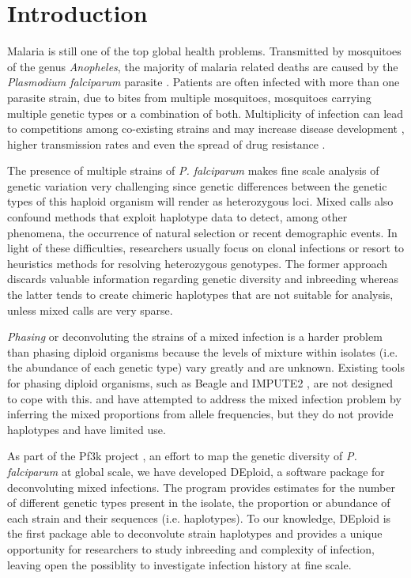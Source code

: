 \documentclass{bioinfo}
\begin{document}
\maketitle

\section{Introduction}
Malaria is still one of the top global health problems. Transmitted by mosquitoes of the genus {\it Anopheles}, the majority of malaria related deaths are caused by the {\it Plasmodium falciparum} parasite \citep{WHO2016}. Patients are often infected with  more than one parasite strain, due to bites from multiple mosquitoes, mosquitoes carrying multiple genetic types or a combination of both. Multiplicity of infection  can lead to competitions among co-existing strains  and may increase  disease development \citep{deRoode2005}, higher transmission rates \citep{Arnot1998} and even the spread of drug resistance \citep{deRoode2004}.

The presence of multiple strains of {\it P. falciparum} makes fine scale analysis of genetic variation very challenging since genetic differences between the genetic types of this haploid organism will render as heterozygous loci. Mixed calls also confound methods that exploit haplotype data to detect, among other phenomena, the occurrence of natural selection or recent demographic events. In light of these difficulties, researchers usually focus on clonal infections or resort to heuristics methods for resolving heterozygous genotypes. The former approach discards valuable information regarding genetic diversity and inbreeding whereas the latter tends to create chimeric haplotypes that are not suitable for analysis, unless mixed calls are very sparse.

{\it Phasing} or deconvoluting the strains of a mixed infection is a harder problem than phasing diploid organisms because the levels of mixture within isolates (i.e. the abundance of each genetic type) vary greatly and are unknown.  Existing tools for phasing diploid organisms, such as Beagle \citep{Browning2007} and IMPUTE2 \citep{Howie2009}, are not designed to cope with this. \citet{Galinsky2015} and \citet{Jack2016} have attempted to address the mixed infection problem by inferring the mixed proportions from allele frequencies, but they do not provide haplotypes and have limited use.


As part of the Pf3k project \citep{Pf3k2016}, an effort to map the genetic diversity of {\it P. falciparum} at global scale, we have developed {\textmd DEploid}, a software package for deconvoluting  mixed infections. The program provides estimates for the number of different genetic types present in the isolate, the proportion or abundance of each strain and their sequences (i.e. haplotypes). To our knowledge, DEploid is the first package able to deconvolute strain haplotypes and provides a unique opportunity for researchers to study inbreeding and complexity of infection, leaving open the possiblity to investigate infection history at fine scale.
\end{document}
